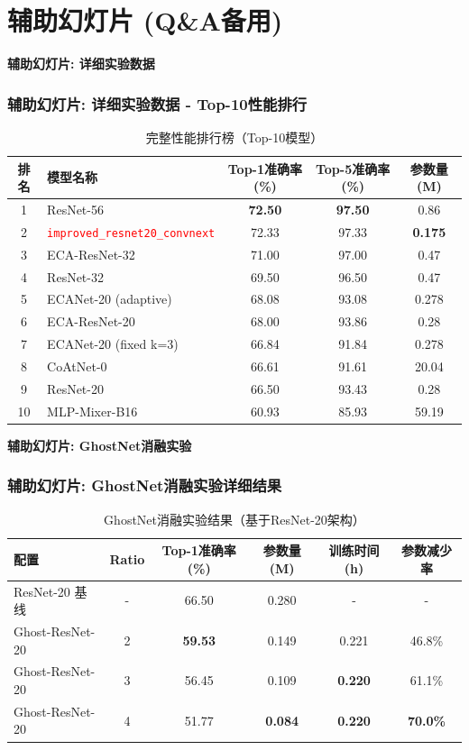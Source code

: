 \documentclass[10pt]{beamer}
\begin{document}
\section{辅助幻灯片 (Q\&A备用)}
\begin{frame}{\textbf{辅助幻灯片: 详细实验数据}}
\frametitle{辅助幻灯片: 详细实验数据 - Top-10性能排行}

\begin{table}[h]
\centering
\scriptsize
\begin{tabular}{|c|l|c|c|c|}
\hline
排名 & 模型名称 & Top-1准确率(\%) & Top-5准确率(\%) & 参数量(M) \\
\hline
1 & ResNet-56 & \textbf{72.50} & \textbf{97.50} & 0.86 \\
2 & \textcolor{red}{\texttt{improved\_resnet20\_convnext}} & 72.33 & 97.33 & \textbf{0.175} \\
3 & ECA-ResNet-32 & 71.00 & 97.00 & 0.47 \\
4 & ResNet-32 & 69.50 & 96.50 & 0.47 \\
5 & ECANet-20 (adaptive) & 68.08 & 93.08 & 0.278 \\
6 & ECA-ResNet-20 & 68.00 & 93.86 & 0.28 \\
7 & ECANet-20 (fixed k=3) & 66.84 & 91.84 & 0.278 \\
8 & CoAtNet-0 & 66.61 & 91.61 & 20.04 \\
9 & ResNet-20 & 66.50 & 93.43 & 0.28 \\
10 & MLP-Mixer-B16 & 60.93 & 85.93 & 59.19 \\
\hline
\end{tabular}
\caption{完整性能排行榜（Top-10模型）}
\end{table}

\end{frame}

\begin{frame}{\textbf{辅助幻灯片: GhostNet消融实验}}
\frametitle{辅助幻灯片: GhostNet消融实验详细结果}

\begin{table}[h]
\centering
\scriptsize
\begin{tabular}{|l|c|c|c|c|c|}
\hline
配置 & Ratio & Top-1准确率(\%) & 参数量(M) & 训练时间(h) & 参数减少率 \\
\hline
ResNet-20 基线 & - & 66.50 & 0.280 & - & - \\
Ghost-ResNet-20 & 2 & \textbf{59.53} & 0.149 & 0.221 & 46.8\% \\
Ghost-ResNet-20 & 3 & 56.45 & 0.109 & \textbf{0.220} & 61.1\% \\
Ghost-ResNet-20 & 4 & 51.77 & \textbf{0.084} & \textbf{0.220} & \textbf{70.0\%} \\
\hline
\end{tabular}
\caption{GhostNet消融实验结果（基于ResNet-20架构）}
\end{table}

\end{frame}
\end{document}
